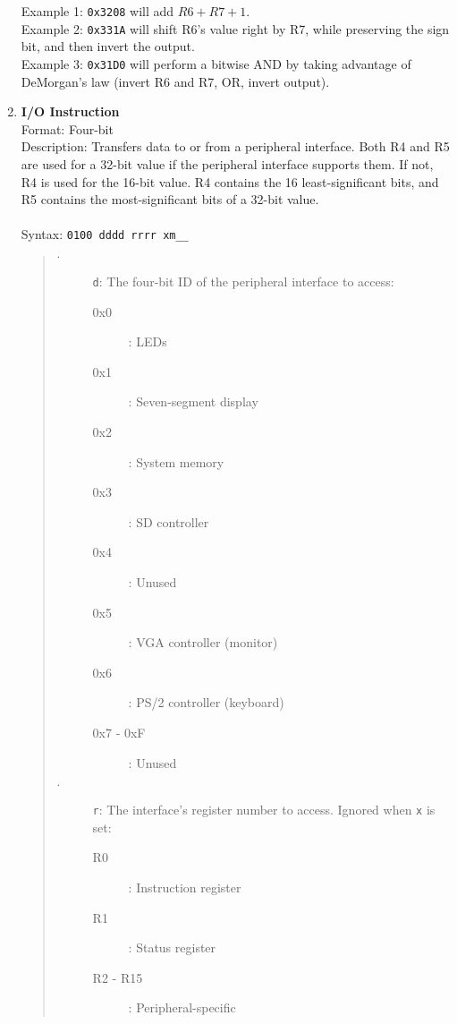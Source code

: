 \documentclass{article}
\begin{document}
\begin{enumerate}
\begin{quote}
\begin{description}
				\end{description}
			\end{quote}
			Example 1: \texttt{0x3208} will add $R6 + R7 + 1$.\\
			Example 2: \texttt{0x331A} will shift R6's value right by R7, while preserving the sign bit, and then invert the output.\\
			Example 3: \texttt{0x31D0} will perform a bitwise AND by taking advantage of DeMorgan's law (invert R6 and R7, OR, invert output). 
			\\
			
			\item \textbf{I/O Instruction}\\
			Format: Four-bit\\
			Description: Transfers data to or from a peripheral interface. Both R4 and R5 are used for a 32-bit value if the peripheral interface supports them. If not, R4 is used for the 16-bit value. R4 contains the 16 least-significant bits, and R5 contains the most-significant bits of a 32-bit value.\\
			\\
			Syntax: \texttt{0100 dddd rrrr xm\_\_}
			\begin{quote}
				\begin{description}
					\item[$\cdot$] \texttt{d}: The four-bit ID of the peripheral interface to access:
					\begin{description}
						\item[0x0]: LEDs
						\item[0x1]: Seven-segment display
						\item[0x2]: System memory
						\item[0x3]: SD controller
						\item[0x4]: Unused
						\item[0x5]: VGA controller (monitor)
						\item[0x6]: PS/2 controller (keyboard)
						\item[0x7 - 0xF]: Unused
					\end{description}
					\item[$\cdot$] \texttt{r}: The interface's register number to access. Ignored when \texttt{x} is set:
					\begin{description}
						\item[R0]: Instruction register
						\item[R1]: Status register
						\item[R2 - R15]: Peripheral-specific

\end{description}
\end{description}
\end{quote}
\end{enumerate}
\end{document}
